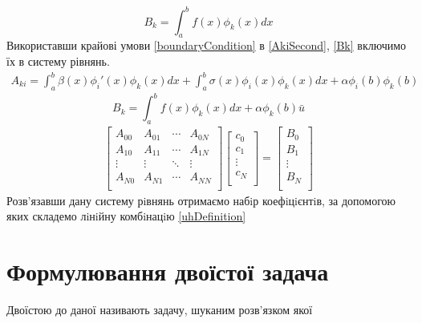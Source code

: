 \documentclass[a4paper]{article}
\numberwithin{equation}{section}
\begin{document}
\begin{equation}\label{Bk}
B_k = \int_a^b f(x)\phi_k(x)dx
\end{equation}
Використавши крайові умови \ref{boundaryCondition} в \ref{AkiSecond}, \ref{Bk} включимо їх в систему рівнянь.
\begin{equation}\label{AkiLast}
\begin{split}
A_{ki}= \int_a^b \beta(x) \phi_i'(x) \phi_k(x) dx+
\int_a^b \sigma(x) \phi_i(x) \phi_k(x) dx + \alpha \phi_i(b) \phi_k(b)  
\end{split}
\end{equation}
\begin{equation}\label{BkLast}
B_k=\int_a^bf(x)\phi_k(x)dx + \alpha \phi_k(b) \bar{u}
\end{equation}
\begin{eqnarray}\label{equationsSystem}
\begin{bmatrix}
A_{00} & A_{01} & \cdots & A_{0N} \\
A_{10} & A_{11} & \cdots & A_{1N} \\
\vdots & \vdots & \ddots & \vdots \\
A_{N0} & A_{N1} & \cdots & A_{NN} \\
\end{bmatrix}
\begin{bmatrix}
c_0 \\
c_1 \\
\vdots \\
c_N \\
\end{bmatrix}
=
\begin{bmatrix}
B_0 \\
B_1 \\
\vdots \\
B_N \\
\end{bmatrix}
\end{eqnarray}
Розв’язавши дану систему рiвнянь отримаємо набiр коефiцiєнтiв, за допомогою яких складемо лiнiйну комбiнацiю \ref{uhDefinition}

\section{Формулювання двоїстої задача}
Двоїстою до даної називають задачу, шуканим розв'язком якої
\end{document}

